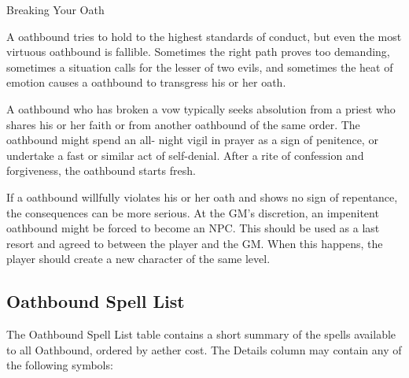 \begin{DndComment}{Breaking Your Oath}

A oathbound tries to hold to the highest standards of conduct, but even the most virtuous oathbound is fallible. Sometimes the right path proves too demanding, sometimes a situation calls for the lesser of two evils, and sometimes the heat of emotion causes a oathbound to transgress his or her oath.

A oathbound who has broken a vow typically seeks absolution from a priest who shares his or her faith or from another oathbound of the same order. The oathbound might spend an all- night vigil in prayer as a sign of penitence, or undertake a fast or similar act of self-denial. After a rite of confession and forgiveness, the oathbound starts fresh.

If a oathbound willfully violates his or her oath and shows no sign of repentance, the consequences can be more serious. At the GM's discretion, an impenitent oathbound might be forced to become an NPC. This should be used as a last resort and agreed to between the player and the GM. When this happens, the player should create a new character of the same level.
\end{DndComment}

\subsection{Oathbound Spell List}
The Oathbound Spell List table contains a short summary of the spells available to all Oathbound, ordered by aether cost. The Details column may contain any of the following symbols:

